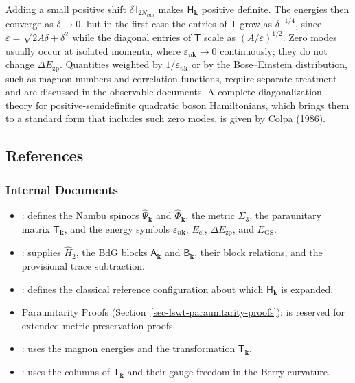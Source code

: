 Adding a small positive shift \(\delta\,\mathsf I_{2N_{\mathrm{sub}}}\) makes \(\mathsf H_{\mathbf k}\) positive definite. The energies then converge as \(\delta\to0\), but in the first case the entries of \(\mathsf T\) grow as \(\delta^{-1/4}\), since \(\varepsilon=\sqrt{2A\delta+\delta^2}\) while the diagonal entries of \(\mathsf T\) scale as \((A/\varepsilon)^{1/2}\). Zero modes usually occur at isolated momenta, where \(\varepsilon_{n\mathbf k}\to0\) continuously; they do not change \(\Delta E_{\mathrm{zp}}\). Quantities weighted by \(1/\varepsilon_{n\mathbf k}\) or by the Bose--Einstein distribution, such as magnon numbers and correlation functions, require separate treatment and are discussed in the observable documents. A complete diagonalization theory for positive-semidefinite quadratic boson Hamiltonians, which brings them to a standard form that includes such zero modes, is given by Colpa (1986).

\subsection{References}

\subsubsection{Internal Documents}

\begin{itemize}
\tightlist
\item
  : defines the Nambu spinors \(\hat\Psi_{\mathbf k}\) and \(\hat\Phi_{\mathbf k}\), the metric \(\Sigma_3\), the paraunitary matrix \(\mathsf T_{\mathbf k}\), and the energy symbols \(\varepsilon_{n\mathbf k}\), \(E_{\mathrm{cl}}\), \(\Delta E_{\mathrm{zp}}\), and \(E_{\mathrm{GS}}\).
\item
  : supplies \(\hat H_2\), the BdG blocks \(\mathsf A_{\mathbf k}\) and \(\mathsf B_{\mathbf k}\), their block relations, and the provisional trace subtraction.
\item
  : defines the classical reference configuration about which \(\mathsf H_{\mathbf k}\) is expanded.
\item
  Paraunitarity Proofs (Section~\ref{sec-lswt-paraunitarity-proofs}): is reserved for extended metric-preservation proofs.
\item
  : uses the magnon energies and the transformation \(\mathsf T_{\mathbf k}\).
\item
  : uses the columns of \(\mathsf T_{\mathbf k}\) and their gauge freedom in the Berry curvature.
\end{itemize}

